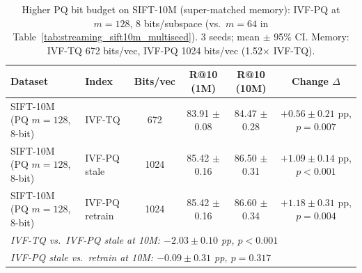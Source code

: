 \begin{table}[t]
\caption{Higher PQ bit budget on SIFT-10M (super-matched memory): IVF-PQ at $m{=}128$, 8 bits/subspace (vs.\ $m{=}64$ in Table~\ref{tab:streaming_sift10m_multiseed}). 3 seeds; mean $\pm$ 95\% CI. Memory: IVF-TQ 672 bits/vec, IVF-PQ 1024 bits/vec (1.52$\times$ IVF-TQ).}
\label{tab:streaming_sift10m_pqhigh}
\centering\small
\begin{tabular}{llcccc}
\toprule
Dataset & Index & Bits/vec & R@10 (1M) & R@10 (10M) & Change $\Delta$ \\
\midrule
  SIFT-10M (PQ $m{=}128$, 8-bit) & IVF-TQ & 672 & 83.91 $\pm$ 0.08 & 84.47 $\pm$ 0.28 & $+0.56 \pm 0.21$ pp, $p=0.007$ \\
  SIFT-10M (PQ $m{=}128$, 8-bit) & IVF-PQ stale & 1024 & 85.42 $\pm$ 0.16 & 86.50 $\pm$ 0.31 & $+1.09 \pm 0.14$ pp, $p<0.001$ \\
  SIFT-10M (PQ $m{=}128$, 8-bit) & IVF-PQ retrain & 1024 & 85.42 $\pm$ 0.16 & 86.60 $\pm$ 0.34 & $+1.18 \pm 0.31$ pp, $p=0.004$ \\
\midrule
\multicolumn{6}{l}{\textit{IVF-TQ vs.\ IVF-PQ stale at 10M: $-2.03 \pm 0.10$ pp, $p<0.001$}} \\
\multicolumn{6}{l}{\textit{IVF-PQ stale vs.\ retrain at 10M: $-0.09 \pm 0.31$ pp, $p=0.317$}} \\
\bottomrule
\end{tabular}
\end{table}
